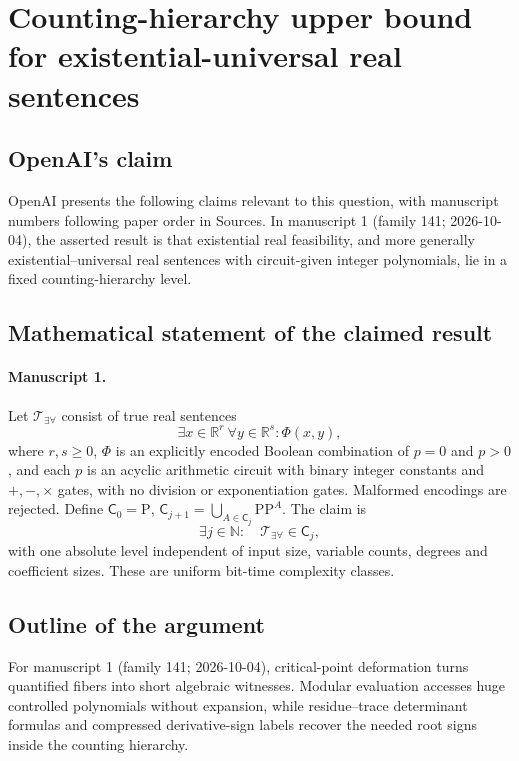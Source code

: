 \documentclass[11pt]{article}
\begin{document}
\section*{Counting-hierarchy upper bound for existential-universal real sentences}

\subsection{OpenAI's claim}
OpenAI presents the following claims relevant to this question, with manuscript numbers following paper order in Sources. In manuscript 1 (family 141; 2026-10-04), the asserted result is that existential real feasibility, and more generally existential--universal real sentences with circuit-given integer polynomials, lie in a fixed counting-hierarchy level.

\subsection{Mathematical statement of the claimed result}
\paragraph{Manuscript 1.}
Let $\mathcal T_{\exists\forall}$ consist of true real sentences
\[
 \exists x\in\mathbb R^r\ \forall y\in\mathbb R^s:\Phi(x,y),
\]
where $r,s\ge0$, $\Phi$ is an explicitly encoded Boolean combination of $p=0$ and $p>0$, and each $p$ is an acyclic arithmetic circuit with binary integer constants and $+,-,\times$ gates, with no division or exponentiation gates. Malformed encodings are rejected. Define $\mathsf C_0=\mathrm P$, $\mathsf C_{j+1}=\bigcup_{A\in\mathsf C_j}\mathrm{PP}^A$. The claim is
\[
 \exists j\in\mathbb N:\quad\mathcal T_{\exists\forall}\in\mathsf C_j,
\]
with one absolute level independent of input size, variable counts, degrees and coefficient sizes. These are uniform bit-time complexity classes.

\subsection{Outline of the argument}
For manuscript 1 (family 141; 2026-10-04), critical-point deformation turns quantified fibers into short algebraic witnesses. Modular evaluation accesses huge controlled polynomials without expansion, while residue--trace determinant formulas and compressed derivative-sign labels recover the needed root signs inside the counting hierarchy.
\end{document}
